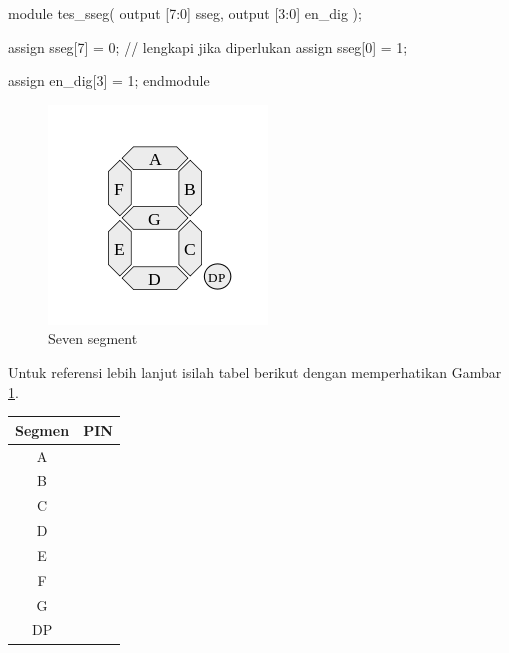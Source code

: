 \begin{verilogcode}
module tes_sseg(
  output [7:0] sseg,
  output [3:0] en_dig
);

  assign sseg[7] = 0;
  // lengkapi jika diperlukan
  assign sseg[0] = 1;
  
  assign en_dig[3] = 1;
endmodule
\end{verilogcode}

\begin{figure}[H]
\centering
\includegraphics[scale=0.5]{images/sseg.png}
\par
\caption{Seven segment}\label{fig:sseg}
\end{figure}

Untuk referensi lebih lanjut isilah tabel berikut dengan memperhatikan Gambar
\ref{fig:sseg}.

\begin{table}[H]
\centering
\begin{tabular}{|c|c|}
\hline
Segmen & PIN \\
\hline
A & \\
\hline
B & \\
\hline
C & \\
\hline
D & \\
\hline
E & \\
\hline
F & \\
\hline
G & \\
\hline
DP & \\
\hline
\end{tabular}
\end{table}
